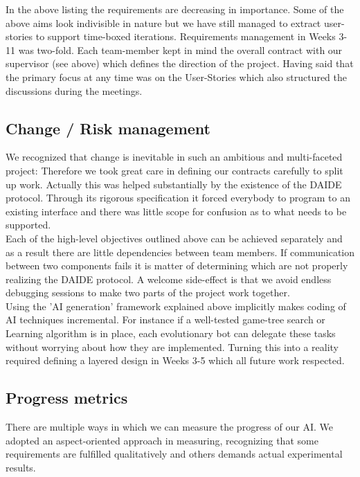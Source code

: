 \documentclass[11pt]{article}
\begin{document}
In the above listing the requirements are decreasing in importance. Some of
the above aims look indivisible in nature but we have still managed to
extract user-stories to support time-boxed iterations. Requirements management
in Weeks 3-11 was two-fold. Each team-member kept in mind the overall contract
with our supervisor (see above) which defines the direction of the project. 
Having said that the primary focus at any time was on the User-Stories which
also structured the discussions during the meetings.

\subsection{Change / Risk management}
We recognized that change is inevitable in such an ambitious and multi-faceted
project: Therefore we took great care in defining our contracts carefully to
split up work. Actually this was helped substantially by the existence of the
DAIDE protocol. Through its rigorous specification it forced everybody to 
program to an existing interface and there was little scope for confusion as
to what needs to be supported. 
\\
Each of the high-level objectives outlined above can be achieved
separately and as a result there are little dependencies between team members.
If communication between two components fails it is matter of determining
which are not properly realizing the DAIDE protocol. A welcome side-effect
is that we avoid endless debugging sessions to make two parts of the project
work together.
\\
Using the 'AI generation' framework explained above implicitly makes coding 
of AI techniques incremental. For instance if a well-tested game-tree search
or Learning algorithm is in place, each evolutionary bot can delegate
these tasks without worrying about how they are implemented. Turning this
into a reality required defining a layered design in Weeks 3-5 which all
future work respected.
\\ 

\subsection{Progress metrics}
There are multiple ways in which we can measure the progress of our AI. 
We adopted an aspect-oriented approach in measuring, recognizing that 
some requirements are fulfilled qualitatively and others demands 
actual experimental results.
\end{document}
